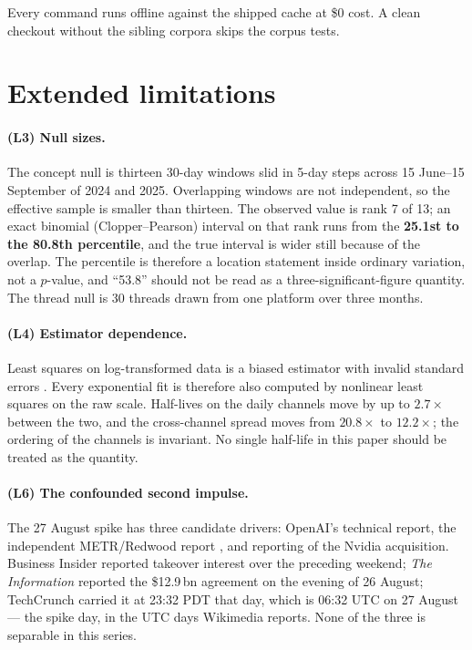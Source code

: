 \documentclass[11pt,a4paper]{article}
\begin{document}
\noindent Every command runs offline against the shipped cache at \$0 cost. A
clean checkout without the sibling corpora skips the corpus tests.

\section{Extended limitations}
\label{sec:limits-ext}

\paragraph{(L3) Null sizes.} The concept null is thirteen 30-day windows slid in
5-day steps across 15 June--15 September of 2024 and 2025. Overlapping windows
are not independent, so the effective sample is smaller than thirteen. The
observed value is rank 7 of 13; an exact binomial (Clopper--Pearson) interval on
that rank runs from the \textbf{25.1st to the 80.8th percentile}, and the true
interval is wider still because of the overlap. The percentile is therefore a
location statement inside ordinary variation, not a $p$-value, and ``53.8''
should not be read as a three-significant-figure quantity. The thread null is 30
threads drawn from one platform over three months.

\paragraph{(L4) Estimator dependence.} Least squares on log-transformed data is
a biased estimator with invalid standard errors \cite{clauset2009powerlaw}.
Every exponential fit is therefore also computed by nonlinear least squares on
the raw scale. Half-lives on the daily channels move by up to $2.7\times$
between the two, and the cross-channel spread moves from $20.8\times$ to
$12.2\times$; the ordering of the channels is invariant. No single half-life in
this paper should be treated as the quantity.

\paragraph{(L6) The confounded second impulse.} The 27 August spike has three
candidate drivers: OpenAI's technical report, the independent METR/Redwood
report \cite{metr2026investigation}, and reporting of the Nvidia acquisition.
Business Insider reported takeover interest over the preceding weekend;
\emph{The Information} reported the \$12.9\,bn agreement on the evening of
26 August; TechCrunch carried it at 23:32 PDT that day, which is 06:32 UTC on
27 August --- the spike day, in the UTC days Wikimedia reports. None of the
three is separable in this series.
\end{document}
